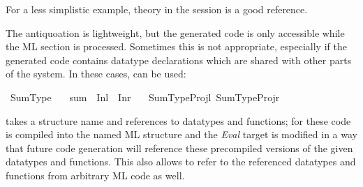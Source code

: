 \begin{isabellebody}
\begin{isamarkuptext}
  For a less simplistic example, theory  in
  the  session is a good reference.%
\end{isamarkuptext}%
\isamarkuptrue%
%
\isamarkuptrue%
%
\begin{isamarkuptext}%
The  antiquoation is lightweight, but the generated code
  is only accessible while the ML section is processed.  Sometimes this
  is not appropriate, especially if the generated code contains datatype
  declarations which are shared with other parts of the system.  In these
  cases, \hypertarget{command.code-reflect}{\hyperlink{command.code-reflect}{\mbox{}}} can be used:%
\end{isamarkuptext}%
\isamarkuptrue%
%
\isadelimquote
%
\endisadelimquote
%
\isatagquote
{}\isamarkupfalse%
\ Sum{\isacharunderscore}Type\isanewline
\ \ \ sum\ {\isacharequal}\ Inl\ {\isacharbar}\ Inr\isanewline
\ \ \ {\isachardoublequoteopen}Sum{\isacharunderscore}Type{\isachardot}Projl{\isachardoublequoteclose}\ {\isachardoublequoteopen}Sum{\isacharunderscore}Type{\isachardot}Projr{\isachardoublequoteclose}%
\endisatagquote
{\isafoldquote}%
%
\isadelimquote
%
\endisadelimquote
%
\begin{isamarkuptext}%
\noindent {}\hypertarget{command.code-reflect}{\hyperlink{command.code-reflect}{\mbox{}}} takes a structure name and
  references to datatypes and functions; for these code is compiled
  into the named ML structure and the \emph{Eval} target is modified
  in a way that future code generation will reference these
  precompiled versions of the given datatypes and functions.  This
  also allows to refer to the referenced datatypes and functions from
  arbitrary ML code as well.


\end{isamarkuptext}
\end{isabellebody}
